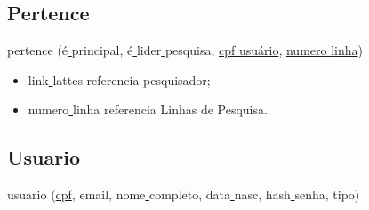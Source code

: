\documentclass[11pt]{../../classes/ifscarticle}
\begin{document}
\subsection{Pertence}
pertence (é\underline{ }\underline{ }principal,
é\underline{ }\underline{ }lider\underline{ }\underline{ }pesquisa,
\underline{cpf\underline{ }\underline{ }usuário},
\underline{numero\underline{ }\underline{ }linha})


\begin{itemize}
    \item link\underline{ }\underline{ }lattes referencia pesquisador;
    \item numero\underline{ }\underline{ }linha referencia Linhas de Pesquisa.
\end{itemize}

\subsection{Usuario}
usuario (\underline{cpf}, email, nome\underline{ }\underline{ }completo, data\underline{ }\underline{ }nasc, hash\underline{ }\underline{ }senha, tipo)

\end{document}
